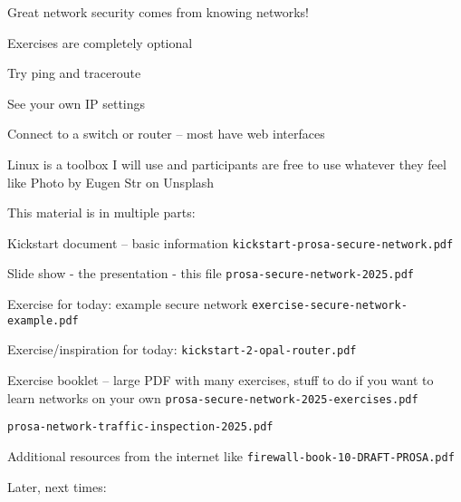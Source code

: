 \documentclass[Screen16to9,17pt]{foils}
\begin{document}
\vskip 5mm

\centerline{\Large Great network security comes from knowing networks!}



Exercises are completely optional

\begin{list2}
\item Try ping and traceroute
\item See your own IP settings
\item Connect to a switch or router -- most have web interfaces
\end{list2}

Linux is a toolbox I will use and participants are free to use whatever they feel like
\hfill Photo by Eugen Str on Unsplash





\begin{list2}
\item This material is in multiple parts:
\item Kickstart document -- basic information
\verb+kickstart-prosa-secure-network.pdf+
\item Slide show - the presentation - this file
\verb+prosa-secure-network-2025.pdf+
\item Exercise for today: example secure network \verb+exercise-secure-network-example.pdf+
\item Exercise/inspiration for today: \verb+kickstart-2-opal-router.pdf+
\item Exercise booklet -- large PDF with many exercises, stuff to do if you want to learn networks on your own
\verb+prosa-secure-network-2025-exercises.pdf+
\item \verb+prosa-network-traffic-inspection-2025.pdf+
\item Additional resources from the internet like \verb+firewall-book-10-DRAFT-PROSA.pdf+
\item Later, next times:
\end{list2}


\end{document}
